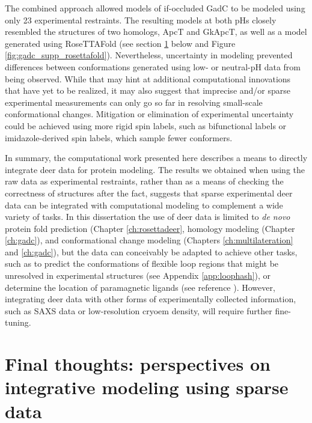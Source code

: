 The combined approach allowed models of \gls{if}-occluded GadC to be modeled using only 23 experimental restraints. The resulting models at both pHs closely resembled the structures of two homologs, ApcT and GkApcT, as well as a model generated using RoseTTAFold (see section \ref{sec:conclusion_integrative_modeling} below and Figure \ref{fig:gadc_supp_rosettafold}). Nevertheless, uncertainty in modeling prevented differences between conformations generated using low- or neutral-pH data from being observed. While that may hint at additional computational innovations that have yet to be realized, it may also suggest that imprecise and/or sparse experimental measurements can only go so far in resolving small-scale conformational changes. Mitigation or elimination of experimental uncertainty could be achieved using more rigid spin labels, such as bifunctional labels or imidazole-derived spin labels, which sample fewer conformers.

In summary, the computational work presented here describes a means to directly integrate \gls{deer} data for protein modeling. The results we obtained when using the raw data as experimental restraints, rather than as a means of checking the correctness of structures after the fact, suggests that sparse experimental \gls{deer} data can be integrated with computational modeling to complement a wide variety of tasks. In this dissertation the use of \gls{deer} data is limited to \emph{de novo} protein fold prediction (Chapter \ref{ch:rosettadeer}, homology modeling (Chapter \ref{ch:gadc}), and conformational change modeling (Chapters \ref{ch:multilateration} and \ref{ch:gadc}), but the data can conceivably be adapted to achieve other tasks, such as to predict the conformations of flexible loop regions that might be unresolved in experimental structures (see Appendix \ref{app:loophash}), or determine the location of paramagnetic ligands (see reference \citep*{Gaffney2012}). However, integrating \gls{deer} data with other forms of experimentally collected information, such as SAXS data or low-resolution \gls{cryoem} density, will require further fine-tuning.

\section{Final thoughts: perspectives on integrative modeling using sparse data}\label{sec:conclusion_integrative_modeling}

